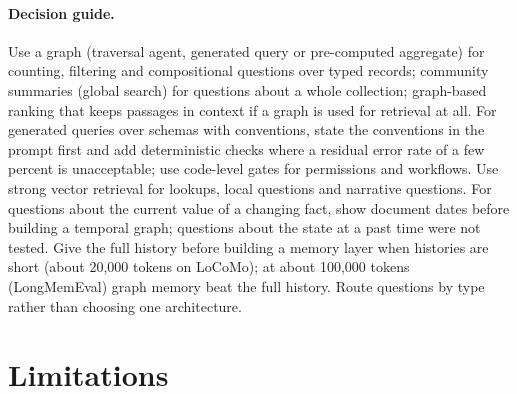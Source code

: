 \documentclass[11pt,a4paper]{article}
\begin{document}
\paragraph{Decision guide.} Use a graph (traversal agent, generated query or pre-computed aggregate) for
counting, filtering and compositional questions over typed records; community summaries (global search) for
questions about a whole collection; graph-based ranking that keeps passages in context if a graph is used for
retrieval at all. For generated queries over schemas with conventions, state the conventions in the prompt first and
add deterministic checks where a residual error rate of a few percent is unacceptable; use code-level gates for
permissions and workflows. Use strong vector retrieval for lookups, local questions and narrative questions. For questions about the current value of a changing
fact, show document dates before building a temporal graph; questions about the state at a past time were not tested.
Give the full history before building a memory layer when histories are short (about 20{,}000 tokens on LoCoMo);
at about 100{,}000 tokens (LongMemEval) graph memory beat the full history. Route questions by type rather than
choosing one architecture.

\section{Limitations}
\label{sec:limitations}
\end{document}
